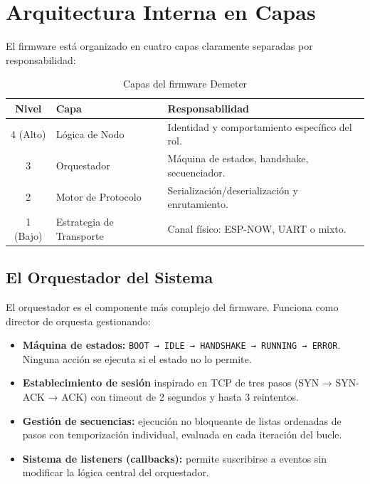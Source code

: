 \section{Arquitectura Interna en Capas}

El firmware está organizado en cuatro capas claramente separadas por responsabilidad:

\begin{table}[H]
    \centering
    \caption{Capas del firmware Demeter}
    \begin{tabular}{clp{8cm}}
        \toprule
        \textbf{Nivel} & \textbf{Capa} & \textbf{Responsabilidad} \\
        \midrule
        4 (Alto) & Lógica de Nodo   & Identidad y comportamiento específico del rol. \\
        3        & Orquestador      & Máquina de estados, handshake, secuenciador. \\
        2        & Motor de Protocolo & Serialización/deserialización y enrutamiento. \\
        1 (Bajo) & Estrategia de Transporte & Canal físico: ESP-NOW, UART o mixto. \\
        \bottomrule
    \end{tabular}
    \label{tab:capas_firmware}
\end{table}

\subsection{El Orquestador del Sistema}

El orquestador es el componente más complejo del firmware. Funciona como director de orquesta
gestionando:

\begin{itemize}[leftmargin=*, label=--]
    \item \textbf{Máquina de estados:}
          \texttt{BOOT → IDLE → HANDSHAKE → RUNNING → ERROR}.
          Ninguna acción se ejecuta si el estado no lo permite.
    \item \textbf{Establecimiento de sesión} inspirado en TCP de tres pasos
          (SYN → SYN-ACK → ACK) con timeout de 2 segundos y hasta 3 reintentos.
    \item \textbf{Gestión de secuencias:} ejecución no bloqueante de listas ordenadas
          de pasos con temporización individual, evaluada en cada iteración del bucle.
    \item \textbf{Sistema de listeners (callbacks):} permite suscribirse a eventos
          sin modificar la lógica central del orquestador.
\end{itemize}

